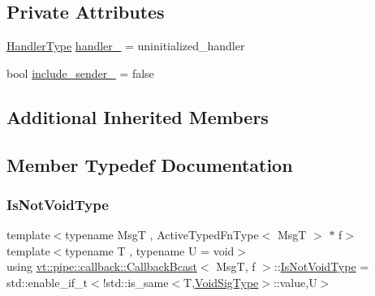 \subsection*{Private Attributes}
\begin{DoxyCompactItemize}
\item 
\hyperlink{namespacevt_af64846b57dfcaf104da3ef6967917573}{Handler\+Type} \hyperlink{structvt_1_1pipe_1_1callback_1_1_callback_bcast_a3ea3dbcdb923e07ef664094954313eb1}{handler\+\_\+} = uninitialized\+\_\+handler
\item 
bool \hyperlink{structvt_1_1pipe_1_1callback_1_1_callback_bcast_a143859ea6a28eec100d0e2b19d13b004}{include\+\_\+sender\+\_\+} = false
\end{DoxyCompactItemize}
\subsection*{Additional Inherited Members}


\subsection{Member Typedef Documentation}
\mbox{\label{structvt_1_1pipe_1_1callback_1_1_callback_bcast_a3f5efa2edf7f4c47fe047e086e63a477}} 
\subsubsection{\texorpdfstring{Is\+Not\+Void\+Type}{IsNotVoidType}}
{\footnotesize\ttfamily template$<$typename MsgT , Active\+Typed\+Fn\+Type$<$ Msg\+T $>$ $\ast$ f$>$ \\
template$<$typename T , typename U  = void$>$ \\
using \hyperlink{structvt_1_1pipe_1_1callback_1_1_callback_bcast}{vt\+::pipe\+::callback\+::\+Callback\+Bcast}$<$ MsgT, f $>$\+::\hyperlink{structvt_1_1pipe_1_1callback_1_1_callback_bcast_a3f5efa2edf7f4c47fe047e086e63a477}{Is\+Not\+Void\+Type} =  std\+::enable\+\_\+if\+\_\+t$<$!std\+::is\+\_\+same$<$T,\hyperlink{structvt_1_1pipe_1_1callback_1_1_callback_bcast_a64032b57b71c27653b93b3e13bf38145}{Void\+Sig\+Type}$>$\+::value,U$>$}

